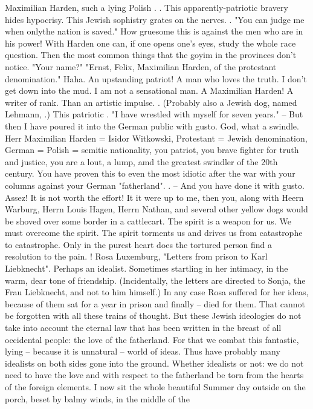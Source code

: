 
Maximilian Harden, such a lying Polish . . This apparently-patriotic bravery hides hypocrisy. This Jewish sophistry grates on the nerves. . "You can judge me when onlythe nation is saved." How gruesome this  is against the men who are in his power! With Harden one can, if one opens one's eyes, study the whole race question. Then the most common things that the goyim in the provinces don't notice. "Your name?" "Ernst, Felix, Maximilian Harden, of the protestant denomination." Haha. An upstanding patriot! A man who loves the truth. I don't get down into the mud. I am not a sensational man. A Maximilian Harden! A writer of rank. Than an artistic impulse. . (Probably also a Jewish dog, named Lehmann, .) This patriotic . "I have wrestled with myself for seven years." -- But then I have poured it into the German public with gusto. God, what a swindle. Herr Maximilian Harden = Isidor Witkowski, Protestant = Jewish denomination, German = Polish = semitic nationality, you patriot, you brave fighter for truth and justice, you are a lout, a lump, amd the greatest swindler of the 20th century. You have proven this to even the most idiotic after the war with your columns against your German "fatherland". . -- And you have done it with gusto. Assez! It is not worth the effort! It it were up to me, then you, along with Heern Warburg, Herrn Louis Hagen, Herrn Nathan, and several other yellow dogs would be shoved over some border in a cattlecart. The spirit is a weapon for us. We must overcome the spirit. The spirit torments us and drives us from catastrophe to catastrophe. Only in the purest heart does the tortured person find a resolution to the pain. ! Rosa Luxemburg, "Letters from prison to Karl Liebknecht". Perhaps an idealist. Sometimes startling in her intimacy, in the warm, dear tone of friendship. (Incidentally, the letters are directed to Sonja, the Frau Liebknecht, and not to him himself.) In any case Rosa suffered for her ideas, because of them sat for a year in prison and finally -- died for them. That cannot be forgotten with all these trains of thought. But these Jewish ideologies do not take into account the eternal law that has been written in the breast of all occidental people: the love of the fatherland. For that we combat this fantastic, lying -- because it is unnatural -- world of ideas. Thus have probably many idealists on both sides gone into the ground. Whether idealists or not: we do not need to have the love and  with respect to the fatherland be torn from the hearts of the foreign elements. I now sit the whole beautiful Summer day outside on the porch, beset by balmy winds, in the middle of the 